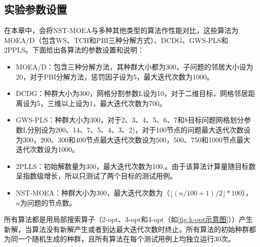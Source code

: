 \subsection{实验参数设置}
\label{subsec:NST:实验与讨论:实验参数设置}
在本章中，会将NST-MOEA与多种其他类型的算法作性能对比，这些算法为MOEA/D（包含WS、TCH和PBI三种分解方式）\cite{zhang2007moea}、DCDG\cite{cai2019collaborative}、GWS-PLS\cite{cai2018grid}和2PPLS\cite{lust2010speed}。下面给出各算法的参数设置和说明：
\begin{itemize}
    \item MOEA/D：包含三种分解方法，其种群大小都为300，子问题的邻居大小设为20，对于PBI分解方法，惩罚因子设为5，最大迭代次数为1000。
    \item DCDG：种群大小为300，网格分割参数L设为10，对于二维目标，网格邻居距离设为5，三维以上设为1，最大迭代次数为700。
    \item GWS-PLS：种群大小为300，对于2、3、4、5、6、7和8目标问题网格划分参数L分别设为200、14、7、5、4、3、2)，对于100节点的问题最大迭代次数设为300，200、300和400节点最大迭代次数设为500，500、750和1000节点最大迭代次数设为1000。
    \item 2PLLS：初始解数量为300，最大迭代次数为100,。由于该算法计算量随目标数呈指数级增长\cite{lust2012multiobjective}，所以只测试了两个目标的测试用例。
    \item NST-MOEA：种群大小为300，最大迭代次数为（$\lfloor (n/100+1)/2 \rfloor * 100$），$n$为问题的节点数。
\end{itemize}
所有算法都是用局部搜索算子（2-opt、3-opt和4-opt（如\autoref{fig:k-opt示意图}））产生新解，当算法没有新解产生或者到达最大迭代次数时终止。所有算法的初始种群都为同一个随机生成的种群，且所有算法在每个测试用例上均独立运行30次。

